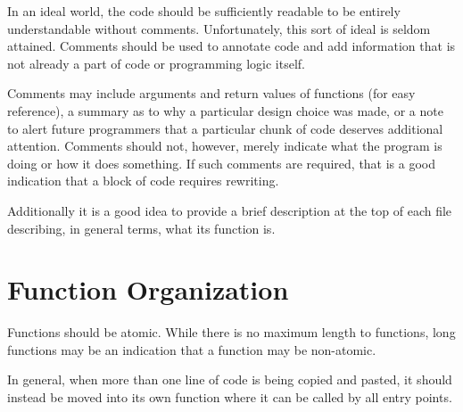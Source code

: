 \documentclass{article}
\begin{document}
In an ideal world, the code should be sufficiently readable to be
entirely understandable without comments.  Unfortunately, this sort of
ideal is seldom attained.  Comments should be used to annotate code
and add information that is not already a part of code or programming
logic itself.

Comments may include arguments and return values of functions (for
easy reference), a summary as to why a particular design choice was
made, or a note to alert future programmers that a particular chunk of
code deserves additional attention.  Comments should not, however,
merely indicate what the program is doing or how it does something.
If such comments are required, that is a good indication that a block
of code requires rewriting.

Additionally it is a good idea to provide a brief description at the top of each
file describing, in general terms, what its function is.

\section{Function Organization}

Functions should be atomic.  While there is no maximum length to functions, long
functions may be an indication that a function may be non-atomic.

In general, when more than one line of code is being copied and
pasted, it should instead be moved into its own function where it can
be called by all entry points.
\end{document}
